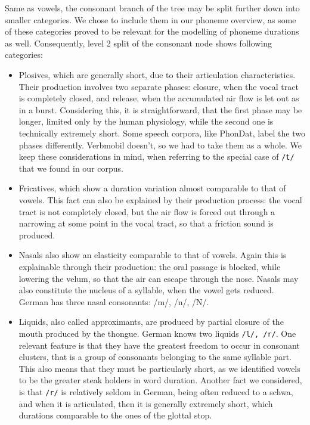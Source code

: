 \documentclass[11pt,a4paper]{scrbook}
\begin{document}
Same as vowels, the consonant branch of the tree may be split further down into smaller categories. We chose to include them in our phoneme overview, as some of these categories proved to be relevant for the modelling of phoneme durations as well. Consequently, level 2 split of the consonant node shows following categories:
\begin{itemize}
	\item Plosives, which are generally short, due to their articulation characteristics. Their production involves two separate phases: closure, when the vocal tract is completely closed, and release, when the accumulated air flow is let out as in a burst. Considering this, it is straightforward, that the first phase may be longer, limited only by the human physiology, while the second one is technically extremely short. Some speech corpora, like PhonDat, label the two phases differently. Verbmobil doesn't, so we had to take them as a whole. We keep these considerations in mind, when referring to the special case of \texttt{/t/} that we found in our corpus.
	\item Fricatives, which show a duration variation almost comparable to that of vowels. This fact can also be explained by their production process: the vocal tract is not completely closed, but the air flow is forced out through a narrowing at some point in the vocal tract, so that a friction sound is produced.
	\item Nasals also show an elasticity comparable to that of vowels. Again this is explainable through their production: the oral passage is blocked, while lowering the velum, so that the air can escape through the nose. Nasals may also constitute the nucleus of a syllable, when the vowel gets reduced. German has three nasal consonants: /m/, /n/, /N/.
	\item Liquids, also called approximants, are produced by partial closure of the mouth produced by the thongue. German knows two liquids \texttt{/l/, /r/}.   One relevant feature is that they have the greatest freedom to occur in consonant clusters, that is a group of consonants belonging to the same syllable part. This also means that they must be particularly short, as we identified vowels to be the greater steak holders in word duration. Another fact we considered, is that \texttt{/r/} is relatively seldom in German, being often reduced to a schwa, and when it is articulated, then it is generally extremely short, which durations comparable to the ones of the glottal stop.
\end{itemize}
\end{document}
